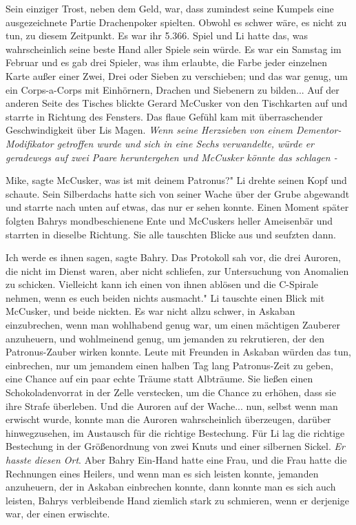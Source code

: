 Sein einziger Trost, neben dem Geld, war, dass zumindest seine Kumpels eine
ausgezeichnete Partie Drachenpoker spielten. Obwohl es schwer wäre, es nicht zu
tun, zu diesem Zeitpunkt. Es war ihr 5.366. Spiel und Li hatte das, was
wahrscheinlich seine beste Hand aller Spiele sein würde. Es war ein Samstag im
Februar und es gab drei Spieler, was ihm erlaubte, die Farbe jeder einzelnen
Karte außer einer Zwei, Drei oder Sieben zu verschieben; und das war genug, um
ein Corps-a-Corps mit Einhörnern, Drachen und Siebenern zu bilden... Auf der
anderen Seite des Tisches blickte Gerard McCusker von den Tischkarten auf und
starrte in Richtung des Fensters. Das flaue Gefühl kam mit überraschender
Geschwindigkeit über Lis Magen. \emph{Wenn seine Herzsieben von einem
Dementor-Modifikator getroffen wurde und sich in eine Sechs verwandelte, würde
er geradewegs auf zwei Paare heruntergehen und McCusker könnte das schlagen -}

\glqq Mike\grqq{}, sagte McCusker, \glqq was ist mit deinem Patronus?" Li drehte
seinen Kopf und schaute. Sein Silberdachs hatte sich von seiner Wache über der
Grube abgewandt und starrte nach unten auf etwas, das nur er sehen konnte. Einen
Moment später folgten Bahrys mondbeschienene Ente und McCuskers heller
Ameisenbär und starrten in dieselbe Richtung. Sie alle tauschten Blicke aus und
seufzten dann.

\glqq Ich werde es ihnen sagen,\grqq{} sagte Bahry. Das Protokoll sah vor, die
drei Auroren, die nicht im Dienst waren, aber nicht schliefen, zur Untersuchung
von Anomalien zu schicken. \glqq Vielleicht kann ich einen von ihnen ablösen und
die C-Spirale nehmen, wenn es euch beiden nichts ausmacht." Li tauschte einen
Blick mit McCusker, und beide nickten. Es war nicht allzu schwer, in Askaban
einzubrechen, wenn man wohlhabend genug war, um einen mächtigen Zauberer
anzuheuern, und wohlmeinend genug, um jemanden zu rekrutieren, der den
Patronus-Zauber wirken konnte. Leute mit Freunden in Askaban würden das tun,
einbrechen, nur um jemandem einen halben Tag lang Patronus-Zeit zu geben, eine
Chance auf ein paar echte Träume statt Albträume. Sie ließen einen
Schokoladenvorrat in der Zelle verstecken, um die Chance zu erhöhen, dass sie
ihre Strafe überleben. Und die Auroren auf der Wache... nun, selbst wenn man
erwischt wurde, konnte man die Auroren wahrscheinlich überzeugen, darüber
hinwegzusehen, im Austausch für die richtige Bestechung. Für Li lag die richtige
Bestechung in der Größenordnung von zwei Knuts und einer silbernen Sickel.
\emph{Er hasste diesen Ort}. Aber Bahry Ein-Hand hatte eine Frau, und die Frau
hatte die Rechnungen eines Heilers, und wenn man es sich leisten konnte,
jemanden anzuheuern, der in Askaban einbrechen konnte, dann konnte man es sich
auch leisten, Bahrys verbleibende Hand ziemlich stark zu schmieren, wenn er
derjenige war, der einen erwischte.

